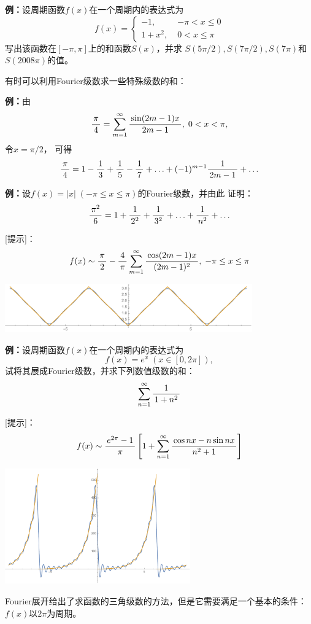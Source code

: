 {\bf 例：}设周期函数$f(x)$在一个周期内的表达式为
$$f(x)=\left\{\begin{array}{ll}
	-1,\;& -\pi<x\leq 0\\
	1+x^2,\; & 0<x\leq\pi
\end{array}\right.$$
写出该函数在$[-\pi,\pi]$上的和函数$S(x)$，并求
$S(5\pi/2),S(7\pi/2),S(7\pi)$和$S(2008\pi)$的值。

有时可以利用Fourier级数求一些特殊级数的和：

{\bf 例：}由
$$\displaystyle\frac{\,{\pi}\,}{\,{4}\,}=\sum\limits_{m=1}^{\infty}
\displaystyle\frac{\,{\sin(2m-1)x}\,}{\,{2m-1}\,},\;0<x<\pi,$$
 令$x=\pi/2$， 可得
$$\displaystyle\frac{\,{\pi}\,}{\,{4}\,}=1-\displaystyle\frac{\,{1}\,}{\,{3}\,}+\displaystyle\frac{\,{1}\,}{\,{5}\,}-\displaystyle\frac{\,{1}\,}{\,{7}\,}+\ldots
+(-1)^{m-1}\displaystyle\frac{\,{1}\,}{\,{2m-1}\,}+\ldots$$

{\bf 例：}设$f(x)=|x|\;(-\pi\leq x\leq \pi)$的Fourier级数，并由此
证明：
$$\displaystyle\frac{\,{\pi^2}\,}{\,{6}\,}=1+\displaystyle\frac{\,{1}\,}{\,{2^2}\,}+\displaystyle\frac{\,{1}\,}{\,{3^2}\,}+\ldots+\displaystyle\frac{\,{1}\,}{\,{n^2}\,}+\ldots$$

[提示]：
$$f(x)\sim\displaystyle\frac{\,{\pi}\,}{\,{2}\,}-\displaystyle\frac{\,{4}\,}{\,{\pi}\,}\sum\limits_{m=1}^{\infty} 
\displaystyle\frac{\,{\cos(2m-1)x}\,}{\,{(2m-1)^2}\,},\;-\pi\leq x\leq \pi$$
\begin{center}
	\includegraphics[width=0.8\textwidth]{./images/ch12/xExp3.pdf}
\end{center}

{\bf 例：}设周期函数$f(x)$在一个周期内的表达式为
$$f(x)=e^x\;(x\in[0,2\pi]),$$
试将其展成Fourier级数，并求下列数值级数的和：
$$\sum\limits_{n=1}^{\infty}\displaystyle\frac{\,{1}\,}{\,{1+n^2}\,}$$

[提示]：
$$f(x)\sim\displaystyle\frac{\,{e^{2\pi}-1}\,}{\,{\pi}\,}\left[1+
\sum\limits_{n=1}^{\infty}\displaystyle\frac{\,{\cos nx-n\sin nx}\,}{\,{n^2+1}\,}\right]$$
\begin{center}
	\includegraphics[width=0.6\textwidth]{./images/ch12/expX11.pdf}
\end{center}

Fourier展开给出了求函数的三角级数的方法，但是它需要满足一个基本的条件：
$f(x)$以$2\pi$为周期。

